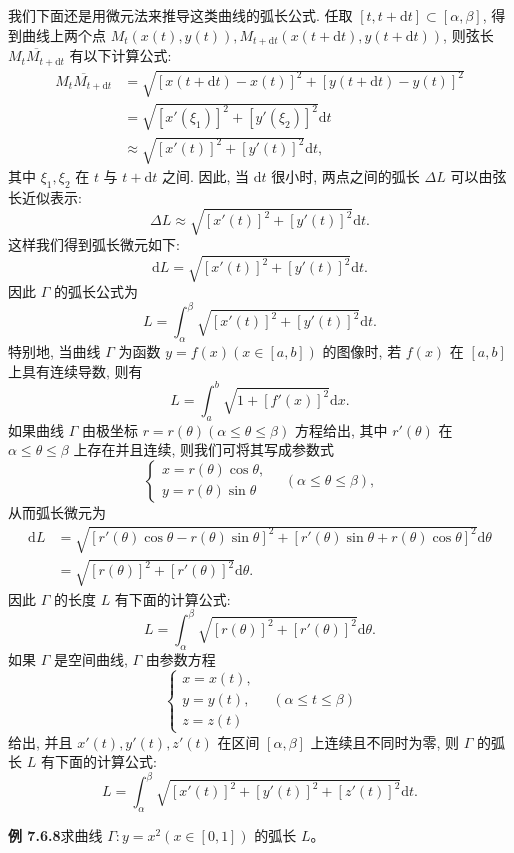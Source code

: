 \documentclass[UTF8, 12pt, fontset=fandol, oneside]{ctexart}
\begin{document}
我们下面还是用微元法来推导这类曲线的弧长公式. 任取 $[t,t+\mathrm dt]\subset[\alpha,\beta]$, 得到曲线上两个点 $M_t(x(t),y(t)),M_{t+\mathrm dt}(x(t+\mathrm dt),y(t+\mathrm dt))$, 则弦长 $\overline{M_tM_{t+\mathrm dt}}$ 有以下计算公式:
\[
\begin{aligned}
  \overline{M_tM_{t+\mathrm dt}}
  &=\sqrt{[x(t+\mathrm dt)-x(t)]^2+[y(t+\mathrm dt)-y(t)]^2}\\
  &=\sqrt{[x'(\xi_1)]^2+[y'(\xi_2)]^2}\mathrm dt\\
  &\approx\sqrt{[x'(t)]^2+[y'(t)]^2}\mathrm dt,
\end{aligned}
\]
其中 $\xi_1,\xi_2$ 在 $t$ 与 $t+\mathrm dt$ 之间. 因此, 当 $\mathrm dt$ 很小时, 两点之间的弧长 $\Delta L$ 可以由弦长近似表示:
\[
  \Delta L\approx\sqrt{[x'(t)]^2+[y'(t)]^2}\mathrm dt.
\]
这样我们得到弧长微元如下:
\[
  \mathrm dL=\sqrt{[x'(t)]^2+[y'(t)]^2}\mathrm dt.
\]
因此 $\Gamma$ 的弧长公式为
\[
  L=\int_\alpha^\beta\sqrt{[x'(t)]^2+[y'(t)]^2}\mathrm dt.
\]
特别地, 当曲线 $\Gamma$ 为函数 $y=f(x)(x\in[a,b])$ 的图像时, 若 $f(x)$ 在 $[a,b]$ 上具有连续导数, 则有
\[
  L=\int_a^b\sqrt{1+[f'(x)]^2}\mathrm dx.
\]
如果曲线 $\Gamma$ 由极坐标 $r=r(\theta)(\alpha\leq\theta\leq\beta)$ 方程给出, 其中 $r'(\theta)$ 在 $\alpha\leq\theta\leq\beta$ 上存在并且连续, 则我们可将其写成参数式
\[
  \begin{cases}
    x=r(\theta)\cos\theta,\\
    y=r(\theta)\sin\theta
  \end{cases}
  \quad(\alpha\leq\theta\leq\beta),
\]
从而弧长微元为
\[
\begin{aligned}
  \mathrm dL
  &=\sqrt{[r'(\theta)\cos\theta-r(\theta)\sin\theta]^2
  +[r'(\theta)\sin\theta+r(\theta)\cos\theta]^2}\mathrm d\theta\\
  &=\sqrt{[r(\theta)]^2+[r'(\theta)]^2}\mathrm d\theta.
\end{aligned}
\]
因此 $\Gamma$ 的长度 $L$ 有下面的计算公式:
\[
  L=\int_\alpha^\beta\sqrt{[r(\theta)]^2+[r'(\theta)]^2}\mathrm d\theta.
\]
如果 $\Gamma$ 是空间曲线, $\Gamma$ 由参数方程
\[
  \begin{cases}
    x=x(t),\\
    y=y(t),\\
    z=z(t)
  \end{cases}
  \quad(\alpha\leq t\leq\beta)
\]
给出, 并且 $x'(t),y'(t),z'(t)$ 在区间 $[\alpha,\beta]$ 上连续且不同时为零, 则 $\Gamma$ 的弧长 $L$ 有下面的计算公式:
\[
  L=\int_\alpha^\beta\sqrt{[x'(t)]^2+[y'(t)]^2+[z'(t)]^2}\mathrm dt.
\]

\noindent\textbf{例 7.6.8}\quad 求曲线 $\Gamma:y=x^2(x\in[0,1])$ 的弧长 $L$。
\end{document}
